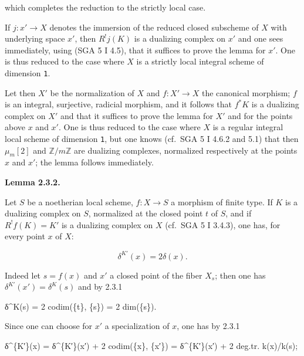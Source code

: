 \documentclass[
  11pt,
  a4paper,
]{book}
\newenvironment{Shaded}{}{}
\newcommand{\NormalTok}[1]{#1}
\begin{document}
which completes the reduction to the strictly local case.

If \(j : {x'} \to X\) denotes the immersion of the reduced closed
subscheme of \(X\) with underlying space \({x'}\), then \(R^{!} j(K)\)
is a dualizing complex on \({x'}\) and one sees immediately, using (SGA
5 I 4.5), that it suffices to prove the lemma for \({x'}\). One is thus
reduced to the case where \(X\) is a strictly local integral scheme of
dimension \texttt{1}.

Let then \(X'\) be the normalization of \(X\) and \(f : X' \to X\) the
canonical morphism; \(f\) is an integral, surjective, radicial morphism,
and it follows that \(f^{*} K\) is a dualizing complex on \(X'\) and
that it suffices to prove the lemma for \(X'\) and for the points above
\(x\) and \(x'\). One is thus reduced to the case where \(X\) is a
regular integral local scheme of dimension \texttt{1}, but one knows
(cf.~SGA 5 I 4.6.2 and 5.1) that then \(\mu_{m}[2]\) and
\(\mathbb{Z}/m\mathbb{Z}\) are dualizing complexes, normalized
respectively at the points \(x\) and \(x'\); the lemma follows
immediately.

\textbf{Lemma 2.3.2.}

Let \(S\) be a noetherian local scheme, \(f : X \to S\) a morphism of
finite type. If \(K\) is a dualizing complex on \(S\), normalized at the
closed point \(t\) of \(S\), and if \(R^{!} f(K) = K'\) is a dualizing
complex on \(X\) (cf.~SGA 5 I 3.4.3), one has, for every point \(x\) of
\(X\):

\[ \delta^{K'}(x) = 2 \delta(x). \]

Indeed let \(s = f(x)\) and \(x'\) a closed point of the fiber
\(X_{s}\); then one has \(\delta^{K'}(x') = \delta^{K}(s)\) and by 2.3.1

\begin{Shaded}
\begin{Highlighting}[]
\NormalTok{δ\^{}K(s) = 2 codim(\{t\}, \{s\}) = 2 dim(\{s\}).}
\end{Highlighting}
\end{Shaded}

Since one can choose for \(x'\) a specialization of \(x\), one has by
2.3.1

\begin{Shaded}
\begin{Highlighting}[]
\NormalTok{δ\^{}\{K′\}(x) = δ\^{}\{K′\}(x′) + 2 codim(\{x\}, \{x′\}) = δ\^{}\{K′\}(x′) + 2 deg.tr. k(x)/k(s);}
\end{Highlighting}
\end{Shaded}
\end{document}
